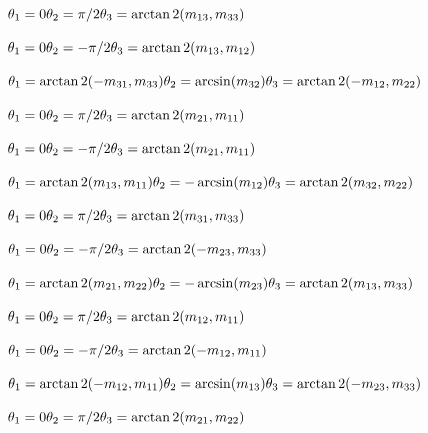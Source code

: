 \documentclass{article}
\begin{document}
$ \theta_1= 0\\ \theta_2=\pi/2\\ \theta_3=\arctan2(m_{13},m_{33}) $
\pagebreak

$ \theta_1=0\\ \theta_2=-\pi/2\\ \theta_3=\arctan2(m_{13},m_{12}) $
\pagebreak

$ \theta_1 = \arctan2(-m_{31},m_{33}) \\\theta_2 = \arcsin(m_{32}) \\\theta_3= \arctan2(-m_{12},m_{22})$
\pagebreak

$ \theta_1= 0\\ \theta_2=\pi/2\\ \theta_3=\arctan2(m_{21},m_{11}) $
\pagebreak

$ \theta_1=0\\ \theta_2=-\pi/2\\ \theta_3=\arctan2(m_{21},m_{11}) $
\pagebreak

$ \theta_1 = \arctan2(m_{13},m_{11})\\\theta_2 = -\arcsin(m_{12}) \\\theta_3= \arctan2(m_{32},m_{22})$
\pagebreak

$ \theta_1= 0\\ \theta_2=\pi/2\\ \theta_3=\arctan2(m_{31},m_{33}) $
\pagebreak

$ \theta_1=0\\ \theta_2=-\pi/2\\ \theta_3=\arctan2(-m_{23},m_{33}) $
\pagebreak

$ \theta_1 = \arctan2(m_{21},m_{22})\\\theta_2 = -\arcsin(m_{23}) \\\theta_3= \arctan2(m_{13},m_{33})$
\pagebreak

$ \theta_1= 0\\ \theta_2=\pi/2\\ \theta_3=\arctan2(m_{12},m_{11}) $
\pagebreak

$ \theta_1= 0\\ \theta_2=-\pi/2\\ \theta_3=\arctan2(-m_{12},m_{11}) $
\pagebreak

$ \theta_1 = \arctan2(-m_{12},m_{11})\\\theta_2 = \arcsin(m_{13}) \\\theta_3= \arctan2(-m_{23},m_{33})$
\pagebreak

$ \theta_1=0\\ \theta_2=\pi/2\\ \theta_3=\arctan2(m_{21},m_{22}) $
\pagebreak
\end{document}
